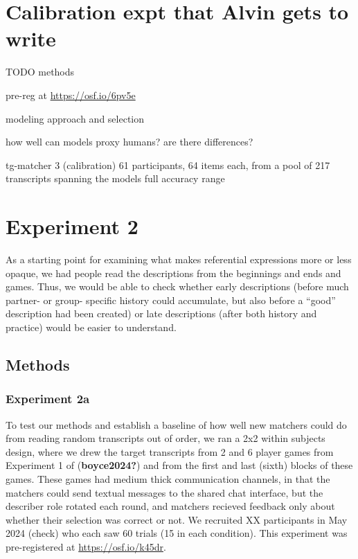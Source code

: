 \documentclass[10pt, letterpaper]{article}
\begin{document}
\section{Calibration expt that Alvin gets to
write}\label{calibration-expt-that-alvin-gets-to-write}

TODO methods

pre-reg at \url{https://osf.io/6pv5e}

modeling approach and selection

how well can models proxy humans? are there differences?

tg-matcher 3 (calibration) 61 participants, 64 items each, from a pool
of 217 transcripts spanning the models full accuracy range

\section{Experiment 2}\label{experiment-2}

As a starting point for examining what makes referential expressions
more or less opaque, we had people read the descriptions from the
beginnings and ends and games. Thus, we would be able to check whether
early descriptions (before much partner- or group- specific history
could accumulate, but also before a ``good'' description had been
created) or late descriptions (after both history and practice) would be
easier to understand.

\subsection{Methods}\label{methods}

\subsubsection{Experiment 2a}\label{experiment-2a}

To test our methods and establish a baseline of how well new matchers
could do from reading random transcripts out of order, we ran a 2x2
within subjects design, where we drew the target transcripts from 2 and
6 player games from Experiment 1 of (\textbf{boyce2024?}) and from the
first and last (sixth) blocks of these games. These games had medium
thick communication channels, in that the matchers could send textual
messages to the shared chat interface, but the describer role rotated
each round, and matchers recieved feedback only about whether their
selection was correct or not. We recruited XX participants in May 2024
(check) who each saw 60 trials (15 in each condition). This experiment
was pre-registered at \url{https://osf.io/k45dr}.
\end{document}
